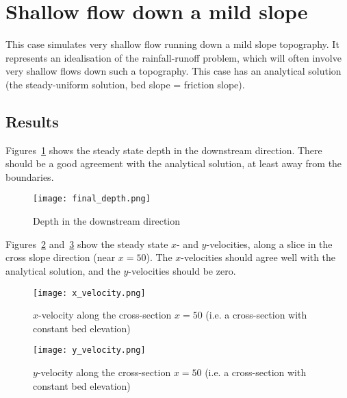 

\section{Shallow flow down a mild slope}
This case simulates very shallow flow running down a mild slope topography. It represents an idealisation of the rainfall-runoff problem, which will often involve very shallow flows down such a topography. This case has an analytical solution (the steady-uniform solution, bed slope = friction slope).   

\subsection{Results}
Figures~\ref{fig:depthdownchan} shows the steady state depth in the downstream direction. There should be a good agreement with the analytical solution, at least away from the boundaries.  

\begin{figure}[h]
\begin{center}
\texttt{[image: final\_depth.png]}
\caption{Depth in the downstream direction}
\label{fig:depthdownchan}
\end{center}
\end{figure}

Figures~\ref{fig:xvelscrosschan} and~\ref{fig:yvelscroschan} show the steady state $x$- and $y$-velocities, along a slice in the cross slope direction (near $x=50$). The $x$-velocities should agree well with the analytical solution, and the $y$-velocities should be zero.  

\begin{figure}[h]
\begin{center}
\texttt{[image: x\_velocity.png]}
\caption{$x$-velocity along the cross-section $x=50$ (i.e. a cross-section with constant bed elevation)}
\label{fig:xvelscrosschan}
\end{center}
\end{figure}

\begin{figure}[h]
\begin{center}
\texttt{[image: y\_velocity.png]}
\caption{$y$-velocity along the cross-section $x=50$ (i.e. a cross-section with constant bed elevation)}
\label{fig:yvelscroschan}
\end{center}
\end{figure}


\endinput
